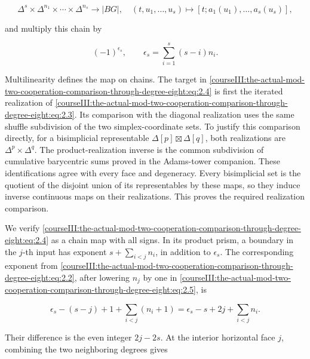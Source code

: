 \begin{equation}
\Delta^s\times\Delta^{n_1}\times\cdots\times\Delta^{n_s}
 \longrightarrow |BG|,
\quad (t,u_1,\ldots,u_s)\longmapsto
[t;a_1(u_1),\ldots,a_s(u_s)],
\label{courseIII:the-actual-mod-two-cooperation-comparison-through-degree-eight:eq:2.4}
\end{equation}

and multiply this chain by

\begin{equation}
(-1)^{\epsilon_s},\qquad
\epsilon_s=\sum_{i=1}^s(s-i)n_i.
\label{courseIII:the-actual-mod-two-cooperation-comparison-through-degree-eight:eq:2.5}
\end{equation}

Multilinearity defines the map on chains. The target in \eqref{courseIII:the-actual-mod-two-cooperation-comparison-through-degree-eight:eq:2.4} is first the iterated realization of \eqref{courseIII:the-actual-mod-two-cooperation-comparison-through-degree-eight:eq:2.3}. Its comparison with the diagonal realization uses the same shuffle subdivision of the two simplex-coordinate sets. To justify this comparison directly, for a bisimplicial representable \(\Delta[p]\boxtimes\Delta[q]\), both realizations are \(\Delta^p\times\Delta^q\). The product-realization inverse is the common subdivision of cumulative barycentric sums proved in the Adams-tower companion. These identifications agree with every face and degeneracy. Every bisimplicial set is the quotient of the disjoint union of its representables by these maps, so they induce inverse continuous maps on their realizations. This proves the required realization comparison.

We verify \eqref{courseIII:the-actual-mod-two-cooperation-comparison-through-degree-eight:eq:2.4} as a chain map with all signs. In its product prism, a boundary in the \(j\)-th input has exponent \(s+\sum_{i<j}n_i\), in addition to \(\epsilon_s\). The corresponding exponent from \eqref{courseIII:the-actual-mod-two-cooperation-comparison-through-degree-eight:eq:2.2}, after lowering \(n_j\) by one in \eqref{courseIII:the-actual-mod-two-cooperation-comparison-through-degree-eight:eq:2.5}, is

\begin{equation}
\epsilon_s-(s-j)+1+\sum_{i<j}(n_i+1)
 =\epsilon_s-s+2j+\sum_{i<j}n_i.
\label{courseIII:the-actual-mod-two-cooperation-comparison-through-degree-eight:eq:2.6}
\end{equation}

Their difference is the even integer \(2j-2s\). At the interior horizontal face \(j\), combining the two neighboring degrees gives

